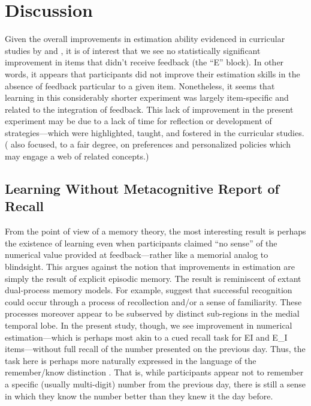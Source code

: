 \section{Discussion}

Given the overall improvements in estimation ability evidenced in curricular
studies by  and
, it is of interest that we see no statistically
significant improvement in items that didn't receive feedback (the ``E'' block).
In other words, it appears that participants did not improve their estimation
skills in the absence of feedback particular to a given item.
Nonetheless, it seems that learning in this considerably shorter experiment was
largely item-specific and related to the integration of feedback. This lack of
improvement in the present experiment may be due to a lack of time for
reflection or development of strategies––which were highlighted, taught, and
fostered in the curricular studies.
( also focused, to
a fair degree, on preferences and personalized policies which may engage a web
of related concepts.)

\subsection{Learning Without Metacognitive Report of Recall}

From the point of view of a memory theory, the most interesting result is
perhaps the existence of learning even when participants claimed “no sense” of
the numerical value provided at feedback---rather like a memorial analog to
blindsight. This argues against the notion that improvements in estimation are
simply the result of explicit episodic memory. The result is reminiscent of
extant dual-process memory models.  For example, 
suggest that successful recognition could occur through a process of
recollection and/or a sense of familiarity.  These processes moreover appear to
be subserved by distinct sub-regions in the medial temporal lobe.  In the
present study, though, we see improvement in numerical estimation---which is
perhaps most akin to a cued recall task for EI and E\_I items---without full
recall of the number presented on the previous day.  Thus, the task here is
perhaps more naturally expressed in the language of the remember/know
distinction .  That is, while participants
appear not to remember a specific (usually multi-digit) number from the previous
day, there is still a sense in which they know the number better than they knew
it the day before.

